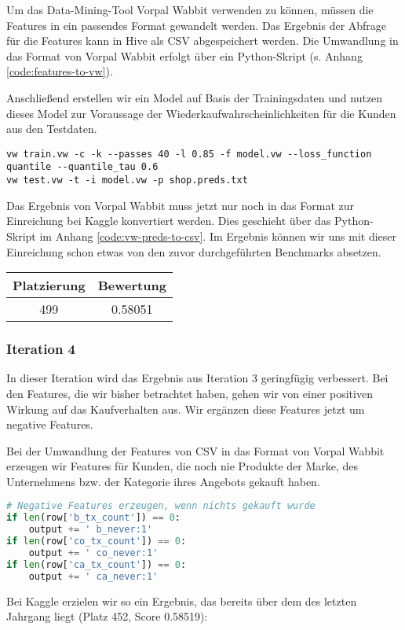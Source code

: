 Um das Data-Mining-Tool Vorpal Wabbit verwenden zu können, müssen die Features in ein
passendes Format gewandelt werden. Das Ergebnis der Abfrage für die Features kann
in Hive als CSV abgespeichert werden. Die Umwandlung in das Format von Vorpal Wabbit
erfolgt über ein Python-Skript (s. Anhang \ref{code:features-to-vw}).

Anschließend erstellen wir ein Model auf Basis der Trainingsdaten und nutzen dieses
Model zur Voraussage der Wiederkaufwahrscheinlichkeiten für die Kunden aus den Testdaten.
\begin{lstlisting}
vw train.vw -c -k --passes 40 -l 0.85 -f model.vw --loss_function quantile --quantile_tau 0.6
vw test.vw -t -i model.vw -p shop.preds.txt
\end{lstlisting}
Das Ergebnis von Vorpal Wabbit muss jetzt nur noch in das Format zur Einreichung bei 
Kaggle konvertiert werden. Dies geschieht über das Python-Skript im Anhang 
\ref{code:vw-preds-to-csv}. Im Ergebnis können wir uns mit dieser Einreichung
schon etwas von den zuvor durchgeführten Benchmarks absetzen.

\begin{tabular}{|c|c|}
	\hline \textbf{Platzierung} & \textbf{Bewertung} \\ 
	\hline 499 & 0.58051  \\ 
	\hline 
\end{tabular}

\subsubsection{Iteration 4}

In dieser Iteration wird das Ergebnis aus Iteration 3 geringfügig verbessert.
Bei den Features, die wir bisher betrachtet haben, gehen wir von einer
positiven Wirkung auf das Kaufverhalten aus. Wir ergänzen diese Features
jetzt um negative Features.

Bei der Umwandlung der Features von CSV in das Format von Vorpal Wabbit 
erzeugen wir Features für Kunden, die noch nie Produkte der Marke,
des Unternehmens bzw. der Kategorie ihres Angebots gekauft haben.
\begin{lstlisting}[language=Python]
# Negative Features erzeugen, wenn nichts gekauft wurde
if len(row['b_tx_count']) == 0:
	output += ' b_never:1'
if len(row['co_tx_count']) == 0:
	output += ' co_never:1'
if len(row['ca_tx_count']) == 0:
	output += ' ca_never:1'
\end{lstlisting}

Bei Kaggle erzielen wir so ein Ergebnis, das bereits über dem des letzten Jahrgang liegt (Platz 452, Score 0.58519):

